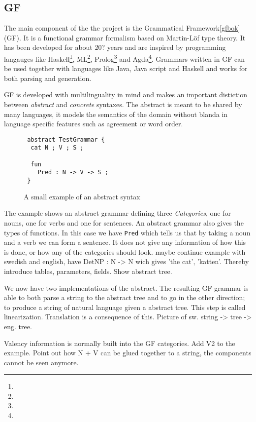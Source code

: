 \documentclass{report}
\begin{document}
\subsection{GF}
The main component of the the project is the Grammatical Framework\ref{gfbok} (GF). It is
a functional grammar formalism based on Martin-Löf type theory.
It has been developed for about 20? years and are inspired by programming langauges
like Haskell\footnote{}, ML\footnote{}, Prolog\footnote{} and Agda\footnote{}. Grammars written in GF can be used together with languages 
like Java, Java script and Haskell and works for both parsing and generation.

GF is developed with multilinguality in mind and makes an important distiction between
\textit{abstract} and \textit{concrete} syntaxes. The abstract is meant to be
shared by many languages, it models the semantics of the domain without blanda in
language specific features such as agreement or word order.

\begin{figure}[h]
\begin{verbatim}
 abstract TestGrammar {
  cat N ; V ; S ;

  fun 
    Pred : N -> V -> S ;
 }
\end{verbatim}
\caption{A small example of an abstract syntax}
\end{figure}

The example shows an abstract grammar defining three \textit{Categories},
one for nouns, one for verbs and one for sentences. An abstract grammar also gives
the types of functions. In this case we have \verb|Pred| which
tells us that by taking a noun and a verb we can form a sentence. It does not
give any information of how this is done, or how any of the categories should look.
maybe continue example with swedish and english, have DetNP : N -> N wich
gives 'the cat', 'katten'. Thereby introduce tables, parameters, fields.
Show abstract tree.

We now have two implementations of the abstract. The resulting GF grammar is able to
both parse a string to the abstract tree and to go in the other direction; to produce
a string of natural language given a abstract tree. This step is called linearization.
Translation is a consequence of this. Picture of sw. string -> tree -> eng. tree.

Valency information is normally built into the GF categories. Add V2 to the example.
Point out how N + V can be glued together to a string, the components cannot be seen
anymore.
\end{document}
